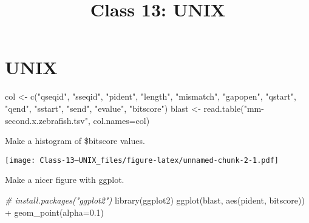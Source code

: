 \documentclass[
]{article}
\title{Class 13: UNIX}
\author{}
\date{\vspace{-2.5em}}
\newenvironment{Shaded}{\begin{snugshade}}{\end{snugshade}}
\newcommand{\AttributeTok}[1]{\textcolor[rgb]{0.77,0.63,0.00}{#1}}
\newcommand{\CommentTok}[1]{\textcolor[rgb]{0.56,0.35,0.01}{\textit{#1}}}
\newcommand{\DecValTok}[1]{\textcolor[rgb]{0.00,0.00,0.81}{#1}}
\newcommand{\FloatTok}[1]{\textcolor[rgb]{0.00,0.00,0.81}{#1}}
\newcommand{\FunctionTok}[1]{\textcolor[rgb]{0.00,0.00,0.00}{#1}}
\newcommand{\NormalTok}[1]{#1}
\newcommand{\OtherTok}[1]{\textcolor[rgb]{0.56,0.35,0.01}{#1}}
\newcommand{\SpecialCharTok}[1]{\textcolor[rgb]{0.00,0.00,0.00}{#1}}
\newcommand{\StringTok}[1]{\textcolor[rgb]{0.31,0.60,0.02}{#1}}
\begin{document}
\maketitle

\hypertarget{unix}{%
\section{UNIX}\label{unix}}

\begin{Shaded}
\begin{Highlighting}[]
\NormalTok{col }\OtherTok{\textless{}{-}} \FunctionTok{c}\NormalTok{(}\StringTok{"qseqid"}\NormalTok{, }\StringTok{"sseqid"}\NormalTok{, }\StringTok{"pident"}\NormalTok{, }\StringTok{"length"}\NormalTok{, }\StringTok{"mismatch"}\NormalTok{, }\StringTok{"gapopen"}\NormalTok{, }\StringTok{"qstart"}\NormalTok{, }\StringTok{"qend"}\NormalTok{, }\StringTok{"sstart"}\NormalTok{, }\StringTok{"send"}\NormalTok{, }\StringTok{"evalue"}\NormalTok{, }\StringTok{"bitscore"}\NormalTok{)}
\NormalTok{blast }\OtherTok{\textless{}{-}} \FunctionTok{read.table}\NormalTok{(}\StringTok{"mm{-}second.x.zebrafish.tsv"}\NormalTok{, }\AttributeTok{col.names=}\NormalTok{col)}
\end{Highlighting}
\end{Shaded}

Make a histogram of \$bitscore values.

\begin{Shaded}
\end{Shaded}

\texttt{[image: Class-13--UNIX\_files/figure-latex/unnamed-chunk-2-1.pdf]}

Make a nicer figure with ggplot.

\begin{Shaded}
\begin{Highlighting}[]
\CommentTok{\# install.packages("ggplot2")}
\FunctionTok{library}\NormalTok{(ggplot2)}
\FunctionTok{ggplot}\NormalTok{(blast, }\FunctionTok{aes}\NormalTok{(pident, bitscore)) }\SpecialCharTok{+} \FunctionTok{geom\_point}\NormalTok{(}\AttributeTok{alpha=}\FloatTok{0.1}\NormalTok{)}
\end{Highlighting}
\end{Shaded}
\end{document}
